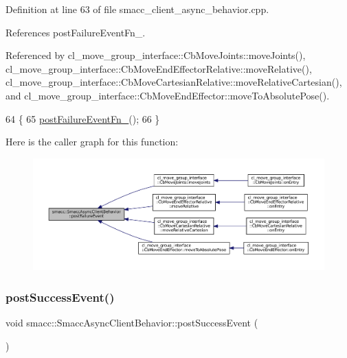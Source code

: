 Definition at line 63 of file smacc\+\_\+client\+\_\+async\+\_\+behavior.\+cpp.



References post\+Failure\+Event\+Fn\+\_\+.



Referenced by cl\+\_\+move\+\_\+group\+\_\+interface\+::\+Cb\+Move\+Joints\+::move\+Joints(), cl\+\_\+move\+\_\+group\+\_\+interface\+::\+Cb\+Move\+End\+Effector\+Relative\+::move\+Relative(), cl\+\_\+move\+\_\+group\+\_\+interface\+::\+Cb\+Move\+Cartesian\+Relative\+::move\+Relative\+Cartesian(), and cl\+\_\+move\+\_\+group\+\_\+interface\+::\+Cb\+Move\+End\+Effector\+::move\+To\+Absolute\+Pose().


\begin{DoxyCode}
64     \{
65         \hyperlink{classsmacc_1_1SmaccAsyncClientBehavior_a8041c43a0381f18fae6470a98eb9273d}{postFailureEventFn\_}();
66     \}
\end{DoxyCode}
Here is the caller graph for this function\+:
\nopagebreak
\begin{figure}[H]
\begin{center}
\leavevmode
\includegraphics[width=350pt]{classsmacc_1_1SmaccAsyncClientBehavior_af6fa358cb1ab5ed16791a201f59260e0_icgraph}
\end{center}
\end{figure}
\mbox{\label{classsmacc_1_1SmaccAsyncClientBehavior_adf18efe1f0e4eacc1277b8865a8a94b1}} 
\subsubsection{\texorpdfstring{post\+Success\+Event()}{postSuccessEvent()}}
{\footnotesize\ttfamily void smacc\+::\+Smacc\+Async\+Client\+Behavior\+::post\+Success\+Event (\begin{DoxyParamCaption}{ }\end{DoxyParamCaption})\hspace{0.3cm}{\ttfamily [protected]}}



